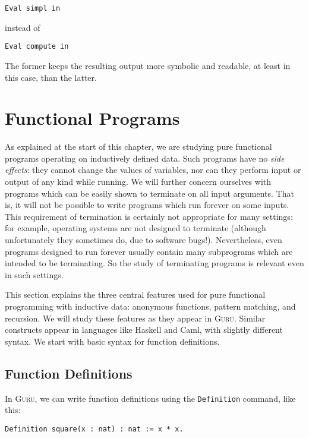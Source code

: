 \documentclass{book}[12pt]
\newcommand{\guru}[0]{\textsc{Guru}}
\begin{document}
\begin{enumerate}
\begin{verbatim}
Eval simpl in 
\end{verbatim}

\noindent instead of

\begin{verbatim}
Eval compute in 
\end{verbatim}

\noindent The former keeps the resulting output more symbolic and
readable, at least in this case, than the latter.

\end{enumerate}

\section{Functional Programs}

As explained at the start of this chapter, we are studying pure
functional programs operating on inductively defined data.  Such
programs have no \emph{side effects}: they cannot change the values of
variables, nor can they perform input or output of any kind while
running.  We will further concern ourselves with programs which can be
easily shown to terminate on all input arguments.  That is, it will
not be possible to write programs which run forever on some inputs.
This requirement of termination is certainly not appropriate for many
settings: for example, operating systems are not designed to terminate
(although unfortunately they sometimes do, due to software bugs!).
Nevertheless, even programs designed to run forever usually contain
many subprograms which are intended to be terminating.  So the study
of terminating programs is relevant even in such settings.

This section explains the three central features used for pure
functional programming with inductive data: anonymous functions,
pattern matching, and recursion.  We will study these features as they
appear in \guru.  Similar constructs appear in languages like Haskell
and Caml, with slightly different syntax.  We start with basic syntax
for function definitions.

\subsection{Function Definitions}

In \guru, we can write function definitions using the \texttt{Definition}
command, like this:

\begin{verbatim}
Definition square(x : nat) : nat := x * x.
\end{verbatim}
\end{document}

